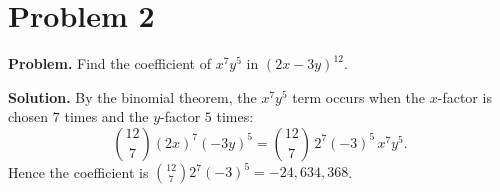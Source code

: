 \section*{Problem 2}
\textbf{Problem.} Find the coefficient of \(x^7y^5\) in \((2x-3y)^{12}\).

\medskip
\textbf{Solution.}
By the binomial theorem, the \(x^7y^5\) term occurs when the \(x\)-factor is chosen \(7\) times and the \(y\)-factor \(5\) times:
\[
\binom{12}{7}(2x)^7(-3y)^5
= \binom{12}{7}\,2^7(-3)^5\,x^7y^5.
\]
Hence the coefficient is
\(\binom{12}{7}2^7(-3)^5 = \boxed{-24{,}634{,}368}\).
